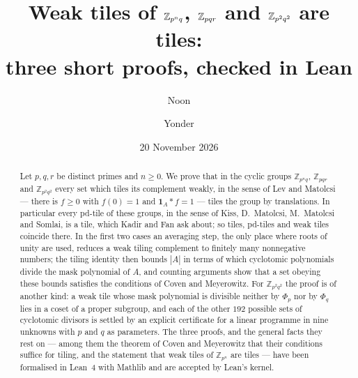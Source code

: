 \documentclass[11pt,a4paper]{amsart}
\title[Weak tiles of $\Z_{p^nq}$, $\Z_{pqr}$ and $\Z_{p^2q^2}$ are tiles]{Weak tiles of $\Z_{p^nq}$, $\Z_{pqr}$ and
$\Z_{p^2q^2}$ are tiles:\\ three short proofs, checked in Lean}
\author{Noon}
\author{Yonder}
\date{20 November 2026}
\theoremstyle{definition}
\theoremstyle{remark}
\newcommand{\Z}{\mathbb{Z}}
\newcommand{\one}{\mathbf{1}}
\begin{document}
\begin{abstract}
Let $p,q,r$ be distinct primes and $n\ge 0$. We prove that in the cyclic groups $\Z_{p^nq}$, $\Z_{pqr}$ and
$\Z_{p^2q^2}$ every set which tiles its complement weakly, in the sense of Lev and Matolcsi --- there is $f\ge 0$ with $f(0)=1$ and
$\one_A*f=1$ --- tiles the group by translations. In particular every pd-tile of these groups, in the sense of
Kiss, D.~Matolcsi, M.~Matolcsi and Somlai, is a tile, which Kadir and Fan ask about; so tiles, pd-tiles and weak
tiles coincide there. In the first two cases an averaging step, the only place where roots of unity are used, reduces a
weak tiling complement to finitely many nonnegative numbers; the tiling identity then bounds $|A|$ in terms of
which cyclotomic polynomials divide the mask polynomial of $A$, and counting arguments show that a set obeying
these bounds satisfies the conditions of Coven and Meyerowitz. For $\Z_{p^2q^2}$ the proof is of another kind:
a weak tile whose mask polynomial is divisible neither by $\Phi_p$ nor by $\Phi_q$ lies in a coset of a proper
subgroup, and each of the other $192$ possible sets of cyclotomic divisors is settled by an explicit certificate
for a linear programme in nine unknowns with $p$ and $q$ as parameters. The three proofs, and the general facts they rest on
--- among them the theorem of Coven and Meyerowitz that their conditions suffice for tiling, and the statement
that weak tiles of $\Z_{p^n}$ are tiles --- have been formalised in Lean~4 with Mathlib and are accepted by
Lean's kernel.
\end{abstract}

\maketitle
\end{document}

